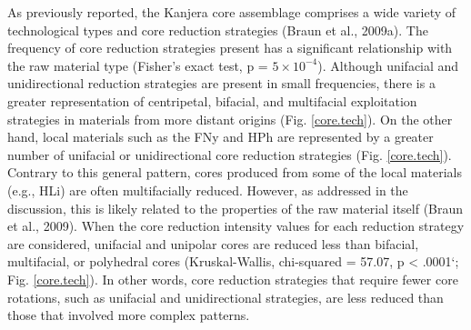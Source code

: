 \documentclass[]{elsarticle} %
\begin{document}
As previously reported, the Kanjera core assemblage comprises a wide
variety of technological types and core reduction strategies
(\hspace{0pt}Braun et al., 2009a\hspace{0pt}). The frequency of core
reduction strategies present has a significant relationship with the raw
material type (Fisher's exact test, p = \ensuremath{5\times 10^{-4}}).
Although unifacial and unidirectional reduction strategies are present
in small frequencies, there is a greater representation of centripetal,
bifacial, and multifacial exploitation strategies in materials from more
distant origins (\hspace{0pt}Fig. \ref{core.tech}). On the other hand,
local materials such as the FNy and HPh are represented by a greater
number of unifacial or unidirectional core reduction strategies
(\hspace{0pt}Fig. \ref{core.tech}\hspace{0pt}). Contrary to this general
pattern, cores produced from some of the local materials (e.g., HLi) are
often multifacially reduced. However, as addressed in the discussion,
this is likely related to the properties of the raw material itself
(Braun et al., 2009). When the core reduction intensity values for each
reduction strategy are considered, unifacial and unipolar cores are
reduced less than bifacial, multifacial, or polyhedral cores
(Kruskal-Wallis, chi-squared = 57.07, p \textless{} .0001`;
\hspace{0pt}Fig. \ref{core.tech}\hspace{0pt}). In other words, core
reduction strategies that require fewer core rotations, such as
unifacial and unidirectional strategies, are less reduced than those
that involved more complex patterns.
\end{document}
